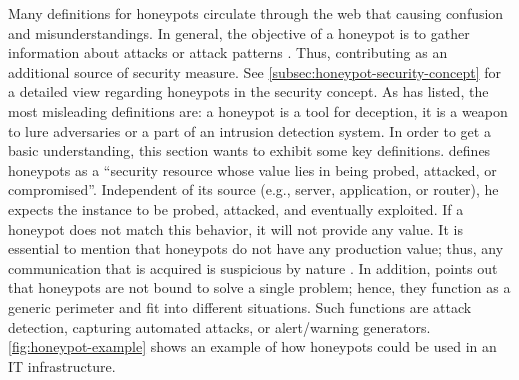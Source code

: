 Many definitions for honeypots circulate through the web that causing confusion and misunderstandings.
In general, the objective of a honeypot is to gather information about attacks or attack patterns \cite{NawrockiWSKS2016}.
Thus, contributing as an additional source of security measure.
See \autoref{subsec:honeypot-security-concept} for a detailed view regarding honeypots in the security concept.
As \citet{Spitzner2003} has listed, the most misleading definitions are: a honeypot is a tool for deception, it is a weapon to lure adversaries or a part of an intrusion detection system.
In order to get a basic understanding, this section wants to exhibit some key definitions.
\citet{Spitzner2003} defines honeypots as a \enquote{security resource whose value lies in being probed, attacked, or compromised}.
Independent of its source (e.g., server, application, or router), he expects the instance to be probed, attacked, and eventually exploited.
If a honeypot does not match this behavior, it will not provide any value.
It is essential to mention that honeypots do not have any production value; thus, any communication that is acquired is suspicious by nature \cite{Spitzner2003}.
In addition, \citet{Spitzner2003} points out that honeypots are not bound to solve a single problem; hence, they function as a generic perimeter and fit into different situations.
Such functions are attack detection, capturing automated attacks, or alert/warning generators.
\autoref{fig:honeypot-example} shows an example of how honeypots could be used in an IT infrastructure.

